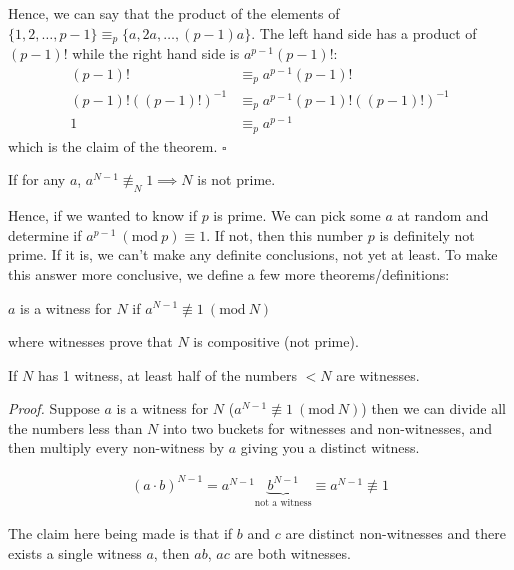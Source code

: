 \documentclass[14pt]{extarticle}
\newcommand{\Mod}[1]{\ (\mathrm{mod}\ #1)}
\begin{document}
    Hence, we can say that the product of the elements of $\{1, 2, \ldots, p -
    1\}\equiv_p \{a, 2a, \ldots, (p - 1)a\}$. The left hand side has a product
    of $(p - 1)!$ while the right hand side is $a^{p - 1}(p-1)!$:
    \begin{align*}
        (p-1)!  &\equiv_p a^{p-1}(p-1)!                             \\
        (p-1)!((p-1)!)^{-1}  &\equiv_p a^{p-1}(p-1)!((p-1)!)^{-1}   \\
        1  &\equiv_p a^{p-1}
    \end{align*}
    which is the claim of the theorem.
    \hfill
    $\square$

    \begin{theorem*}
        If for any $a$, $a^{N-1} \not\equiv_N 1 \implies N$ is not prime. 
    \end{theorem*}

    Hence, if we wanted to know if $p$ is prime. We can pick some $a$ at random
    and determine if $a^{p-1} \Mod{p}\equiv 1$. If not, then this number $p$
    is definitely not prime. If it is, we can't make any definite conclusions,
    not yet at least. To make this answer more conclusive, we define a few
    more theorems/definitions:

    \begin{definition*}
        $a$ is a witness for $N$ if $a^{N-1} \not\equiv 1\Mod{N}$
    \end{definition*}
    where witnesses prove that $N$ is compositive (not prime).

    \begin{theorem*}
        If $N$ has 1 witness, at least half of the numbers $< N$
        are witnesses.
    \end{theorem*}

    \textit{Proof.} Suppose $a$ is a witness for $N$ ($a^{N-1} \not\equiv 1
    \Mod{N}$) then we can divide all the numbers less than $N$ into two
    buckets for witnesses and non-witnesses, and then multiply every 
    non-witness by $a$ giving you a distinct witness.

    \begin{align*}
        (a\cdot b)^{N-1} = a^{N-1}\underbrace{b^{N-1}}_{\text{not a witness}}
        \equiv a^{N-1} \not\equiv 1
    \end{align*}

    The claim here being made is that if $b$ and $c$ are distinct
    non-witnesses and there exists a single witness $a$, then $ab$, $ac$
    are both witnesses.\\
\end{document}
